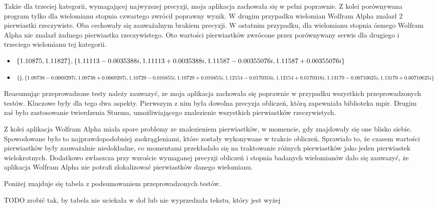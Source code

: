 Także dla trzeciej kategorii, wymagającej najwyzszej precyzji, moja aplikacja zachowała się w pełni poprawnie. Z kolei porównywana program tylko dla wielomianu stopnia czwartego zwrócił poprawny wynik. W drugim przypadku wielomian Wolfram Alpha znalazł 2 pierwiastki rzeczywiste. Oba cechowały się zauważalnym brakiem precyzji. W ostatnim przypadku, dla wielomianu stopnia ósmego Wolfram Alpha nie znalazł żadnego pierwiastka rzeczywistego. Oto wartości pierwiastków zwrócone przez porównywany serwis dla drugiego i trzeciego wielomianu tej kategorii.

\begin{itemize}
	\item $\{1.10875, 1.11827\}, \{1.11113-0.0035388i,1.11113+0.0035388i, \\
	1.11587-0.00355076i, 1.11587+0.00355076i\}$
	\item $\{\}, \{1.09738-0.0069297i,1.09738+0.0069297i, 1.10729-0.016855i, \\
	1.10729+0.016855i, 1.12154-0.0170316i, 1.12154+0.0170316i, 1.13179-0.00710625i, \\ 1.13179+0.00710625i\}$
\end{itemize}	

Reasumując przeprowadzone testy należy zauwazyć, ze moja aplikacja zachowała się poprawnie w przypadku wszystkich przeprowadzonych testów. Kluczowe były dla tego dwa aspekty. Pierwszym z nim była dowolna precyzja obliczeń, którą zapewniała biblioteka mpir. Drugim zaś było zastosowanie twierdzenia Sturma, umożliwiającego znalezienie wszystkich pierwiastków rzeczywistych.

Z kolei aplikacja Wolfram Alpha miała spore problemy ze znalezieniem pierwiastków, w momencie, gdy znajdowały się one blisko siebie. Spowodowane było to najprawdopodobniej zaokrągleniami, które zostały wykonywane w trakcie obliczeń. Sprawiało to, że czasem wartości pierwiastków były zauważalnie niedokładne, co momentami przekładało się na traktowanie różnych pierwiastków jako jeden pierwiastek wielokrotnych. Dodatkowo zwłaszcza przy wzroście wymaganej precyzji obliczeń i stopnia badanych wielomianów dało się zauwazyć, że aplikacja Wolfram Alpha nie potrafi zlokalizować pierwiastków danego wielomianu.

Poniżej znajduje się tabela z podsumowaniem przeprowadzonych testów.

\newpage
TODO zrobić tak, by tabela nie uciekała w doł lub nie wyprzedzała tekstu, który jest wyżej

